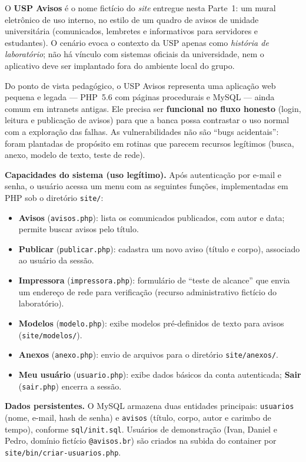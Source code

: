   O \textbf{USP Avisos} é o nome fictício do \emph{site} entregue nesta Parte~1: um mural eletrônico
  de uso interno, no estilo de um quadro de avisos de unidade universitária (comunicados, lembretes e
  informativos para servidores e estudantes). O cenário evoca o contexto da USP apenas como \emph{história
  de laboratório}; não há vínculo com sistemas oficiais da universidade, nem o aplicativo deve ser
  implantado fora do ambiente local do grupo.
  
  Do ponto de vista pedagógico, o USP Avisos representa uma aplicação web pequena e legada --- PHP~5.6
  com páginas procedurais e MySQL --- ainda comum em intranets antigas. Ele precisa ser \textbf{funcional
  no fluxo honesto} (login, leitura e publicação de avisos) para que a banca possa contrastar o uso
  normal com a exploração das falhas. As vulnerabilidades não são ``bugs acidentais'': foram plantadas
  de propósito em rotinas que parecem recursos legítimos (busca, anexo, modelo de texto, teste de rede).
  
  \textbf{Capacidades do sistema (uso legítimo).} Após autenticação por e-mail e senha, o usuário
  acessa um menu com as seguintes funções, implementadas em PHP sob o diretório \texttt{site/}:
  
  \begin{itemize}
      \item \textbf{Avisos} (\texttt{avisos.php}): lista os comunicados publicados, com autor e data;
            permite buscar avisos pelo título.
      \item \textbf{Publicar} (\texttt{publicar.php}): cadastra um novo aviso (título e corpo), associado
            ao usuário da sessão.
      \item \textbf{Impressora} (\texttt{impressora.php}): formulário de ``teste de alcance'' que envia
            um endereço de rede para verificação (recurso administrativo fictício do laboratório).
      \item \textbf{Modelos} (\texttt{modelo.php}): exibe modelos pré-definidos de texto para avisos
            (\texttt{site/modelos/}).
      \item \textbf{Anexos} (\texttt{anexo.php}): envio de arquivos para o diretório \texttt{site/anexos/}.
      \item \textbf{Meu usuário} (\texttt{usuario.php}): exibe dados básicos da conta autenticada;
            \textbf{Sair} (\texttt{sair.php}) encerra a sessão.
  \end{itemize}
  
  \textbf{Dados persistentes.} O MySQL armazena duas entidades principais: \texttt{usuarios} (nome,
  e-mail, hash de senha) e \texttt{avisos} (título, corpo, autor e carimbo de tempo), conforme
  \texttt{sql/init.sql}. Usuários de demonstração (Ivan, Daniel e Pedro, domínio fictício
  \texttt{@avisos.br}) são criados na subida do container por \texttt{site/bin/criar-usuarios.php}.
  
